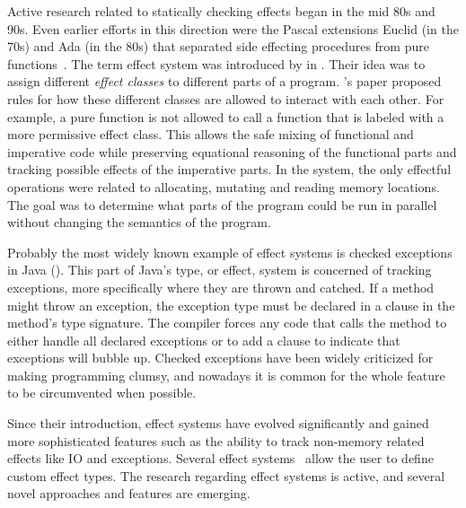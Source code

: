 Active research related to statically checking effects began in the mid 80s and 90s. Even earlier efforts in this direction were the Pascal extensions Euclid (in the 70s) and Ada (in the 80s) that separated side effecting procedures from pure functions~\cite{real-prog-in-fp}. The term effect system was introduced by \textcite{intgr-fp-ip} in \citeyear{intgr-fp-ip}. Their idea was to assign different \emph{effect classes} to different parts of a program. \citeauthor{intgr-fp-ip}'s paper proposed rules for how these different classes are allowed to interact with each other. For example, a pure function is not allowed to call a function that is labeled with a more permissive effect class. This allows the safe mixing of functional and imperative code while preserving equational reasoning of the functional parts and tracking possible effects of the imperative parts. In the system, the only effectful operations were related to allocating, mutating and reading memory locations. The goal was to determine what parts of the program could be run in parallel without changing the semantics of the program.

Probably the most widely known example of effect systems is checked exceptions in Java (). This part of Java's type, or effect, system is concerned of tracking exceptions, more specifically where they are thrown and catched. If a method might throw an exception, the exception type must be declared in a  clause in the method's type signature. The compiler forces any code that calls the method to either handle all declared exceptions or to add a  clause to indicate that exceptions will bubble up. Checked exceptions have been widely criticized for making programming clumsy, and nowadays it is common for the whole feature to be circumvented when possible.



Since their introduction, effect systems have evolved significantly and gained more sophisticated features such as the ability to track non-memory related effects like IO and exceptions. Several effect systems~\cite{koka-lang, frank-lang, unison-lang, ocaml-lang} allow the user to define custom effect types. The research regarding effect systems is active, and several novel approaches and features are emerging.


